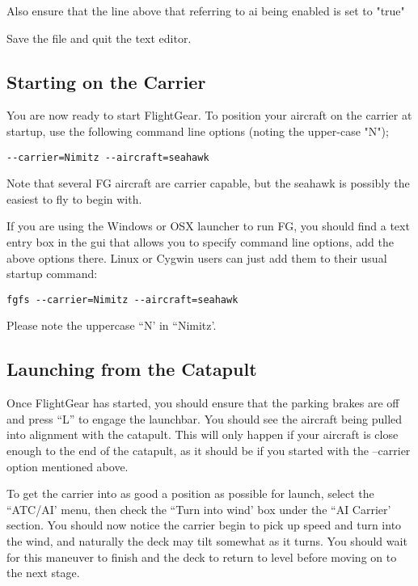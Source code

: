 Also ensure that the line above that referring to ai being enabled is set to "true"

Save the file and quit the text editor.

\subsection{Starting on the Carrier}

You are now ready to start FlightGear. To position your aircraft on the carrier at startup, 
use the following command line options (noting the upper-case "N");

\begin{verbatim}
--carrier=Nimitz --aircraft=seahawk 
\end{verbatim}

Note that several FG aircraft are carrier capable, but the seahawk is possibly the easiest to fly to begin with.

If you are using the Windows or OSX launcher to run FG, you should find a text entry box in the gui that 
allows you to specify command line options, add the above options there. Linux or Cygwin users can just 
add them to their usual startup command: 

\begin{verbatim}
fgfs --carrier=Nimitz --aircraft=seahawk
\end{verbatim}

Please note the uppercase ``N' in ``Nimitz'.

\subsection{Launching from the Catapult}

Once FlightGear has started, you should ensure that the parking brakes are off and press ``L''
to engage the launchbar. You should see the aircraft being pulled into alignment with the catapult. 
This will only happen if your aircraft is close enough to the end of the catapult, as it should be if 
you started with the --carrier option mentioned above.

To get the carrier into as good a position as possible for launch, select the ``ATC/AI' menu, then 
check the ``Turn into wind' box under the ``AI Carrier' section. You should now notice the carrier 
begin to pick up speed and turn into the wind, and naturally the deck may tilt somewhat as it turns. 
You should wait for this maneuver to finish and the deck to return to level before moving on to the next stage.

